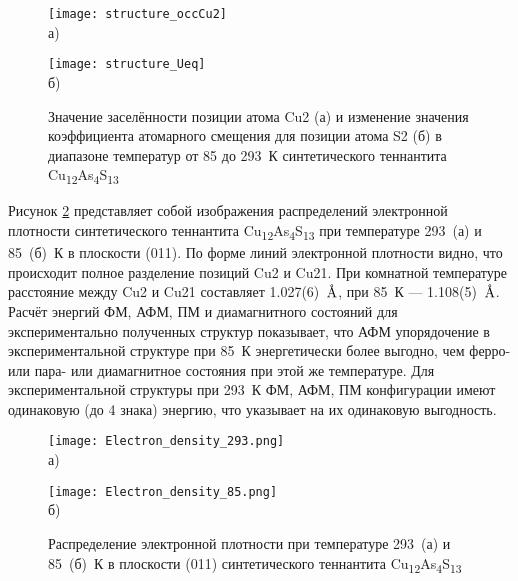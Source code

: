 \begin{figure}[ht]
  \begin{minipage}[ht]{0.5\linewidth}\centering
    \texttt{[image: structure\_occCu2]} \\ а)
  \end{minipage}
  \hfill
  \begin{minipage}[ht]{0.5\linewidth}\centering
    \texttt{[image: structure\_Ueq]} \\ б)
  \end{minipage}

      \caption[Значение заселённости позиции атома Cu2 (а) и изменение значения коэффициента атомарного смещения для позиции атома S2 (б) в диапазоне температур от 85 до 293~К синтетического теннантита Cu\textsubscript{12}As\textsubscript{4}S\textsubscript{13}]{Значение заселённости позиции атома Cu2 (а) и изменение значения коэффициента атомарного смещения для позиции атома S2 (б) в диапазоне температур от 85 до 293~К синтетического теннантита Cu\textsubscript{12}As\textsubscript{4}S\textsubscript{13}}
    \label{img:xray}
\end{figure}

Рисунок \ref{img:xray2} представляет собой изображения распределений электронной плотности синтетического теннантита Cu\textsubscript{12}As\textsubscript{4}S\textsubscript{13} при температуре 293~(а) и 85~(б)~К в плоскости (011). По форме линий электронной плотности видно, что происходит полное разделение позиций Cu2 и Cu21. При комнатной температуре расстояние между Cu2 и Cu21 составляет 1.027(6)~$\mbox{\normalfont\AA}$, при 85~К --- 1.108(5)~$\mbox{\normalfont\AA}$. Расчёт энергий ФМ, АФМ, ПМ и диамагнитного состояний для экспериментально полученных структур показывает, что АФМ упорядочение в экспериментальной структуре при 85~К энергетически более выгодно, чем ферро- или пара- или диамагнитное состояния при этой же температуре. Для экспериментальной структуры при 293~К ФМ, АФМ, ПМ конфигурации имеют одинаковую (до 4 знака) энергию, что указывает на их одинаковую выгодность.

\begin{figure}[ht]
  \begin{minipage}[ht]{0.5\linewidth}\centering
    \texttt{[image: Electron\_density\_293.png]} \\ а)
  \end{minipage}
  \hfill
  \begin{minipage}[ht]{0.5\linewidth}\centering
    \texttt{[image: Electron\_density\_85.png]} \\ б)
  \end{minipage}

      \caption[Распределение электронной плотности при температуре 293~(а) и 85~(б)~К в плоскости (011) синтетического теннантита Cu\textsubscript{12}As\textsubscript{4}S\textsubscript{13}]{Распределение электронной плотности при температуре 293~(а) и 85~(б)~К в плоскости (011) синтетического теннантита Cu\textsubscript{12}As\textsubscript{4}S\textsubscript{13}}
    \label{img:xray2}
\end{figure}



